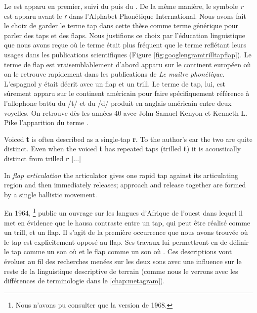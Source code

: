 Le  est apparu en premier, suivi du  puis du . De la même manière, le symbole \textit{r} est apparu avant le \textit{ɾ} dans l'Alphabet Phonétique International. Nous avons fait le choix de garder le terme tap dans cette thèse comme terme générique pour parler des taps et des flaps. Nous justifions ce choix par l'éducation linguistique que nous avons reçue où le terme  était plus fréquent que le terme  reflétant leurs usages dans les publications scientifiques (Figure \ref{fig:googlengramtrilltapflap}). Le terme de flap est vraisemblablement d'abord apparu sur le continent européen où on le retrouve rapidement dans les publications de \textit{Le maître phonétique}. L'espagnol y était décrit avec un flap \parencite[8]{passySupplementAimPrincipales1904} et un trill. Le terme de tap, lui, est sûrement apparu sur le continent américain pour faire spécifiquement référence à l'allophone battu du /t/ et du /d/ produit en anglais américain entre deux voyelles. On retrouve dès les années 40 avec John Samuel Kenyon et Kenneth L. Pike l'apparition du terme .

\begin{displayquote}
Voiced \textbf{t} is often described as a single-tap \textbf{r}. To the author's ear the two are quite distinct. Even when the voiced \textbf{t} has repeated taps (trilled  \textbf{t}) it is acoustically distinct from trilled \textbf{r} [...] \parencite[127]{kenyonAmericanPronunciation1943}
\end{displayquote}


\begin{displayquote}
In \textit{flap articulation} the articulator gives one rapid tap against its articulating region and then immediately releases; approach and release together are formed by a single ballistic movement. \parencite[124-125]{pikePhoneticsCriticalAnalysis1943}\
\end{displayquote}

En 1964, \citeauthor{ladefogedPhoneticStudyWest1968}\footnote{Nous n'avons pu consulter que la version de 1968.} publie un ouvrage sur les langues d'Afrique de l'ouest dans lequel il met en évidence que le hausa  contraste entre un tap, qui peut être réalisé comme un trill, et un flap. Il s'agit de la première occurrence que nous avons trouvée où le tap est explicitement opposé au flap. Ses travaux lui permettront en \citeyear{ladefogedPreliminariesLinguisticPhonetics1971} de définir le tap comme un son où  et le flap comme un son où  \parencite[46]{ladefogedPreliminariesLinguisticPhonetics1971}. Ces descriptions vont évoluer au fil des recherches menées sur les deux sons avec une influence sur le reste de la linguistique descriptive de terrain (comme nous le verrons avec les différences de terminologie dans le \autoref{chap:metagram}).

